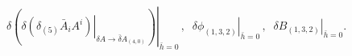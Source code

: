 \begin{equation*}
\left. \delta\left( \delta\left. (\delta_{(5)}\bar{A}_{i}A^{i})\right|
_{\delta A\longrightarrow\bar{\delta}A_{(4,0)}}\right) \right| _{\bar{h}%
=0}\,,\;\;\left. \delta\phi_{(1,3,2)}\right| _{\bar{h}=0}\,,\;\;\left.
\delta B_{(1,3,2)}\right| _{\bar{h}=0}.
\end{equation*}

